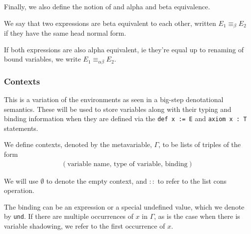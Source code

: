\documentclass{article}
\begin{document}

Finally, we also define the notion of and alpha and beta equivalence. 

\begin{definition} 
We say that two expressions are beta equivalent to each other, written
$E_1 \equiv_\beta E_2$ if they have the same head normal form.

If both expressions are also alpha equivalent, ie
they're equal up to renaming of bound variables, we write
$E_1 \equiv_{\alpha \beta} E_2$.
\end{definition}


\subsubsection{Contexts}
This is a variation of the environments as seen in a big-step denotational
semantics.
These will be used to store variables along with their typing and binding information
when they are defined via the \texttt{def x := E} and \verb|axiom x : T| statements.

We define contexts, denoted by the metavariable, $\Gamma$, to be lists of
triples of the form
\begin{align*}
  (\text{variable name}, \, \text{type of variable}, \, \text{binding})
\end{align*}

We will use $\emptyset$ to denote the empty context, and $::$ to refer to the
list cons operation.

The binding can be an expression or a special undefined value, which we denote by
\texttt{und}.
If there are multiple occurrences of $x$ in $\Gamma$,
as is the case when there is variable shadowing, we refer to the first occurrence
of $x$.
\end{document}
